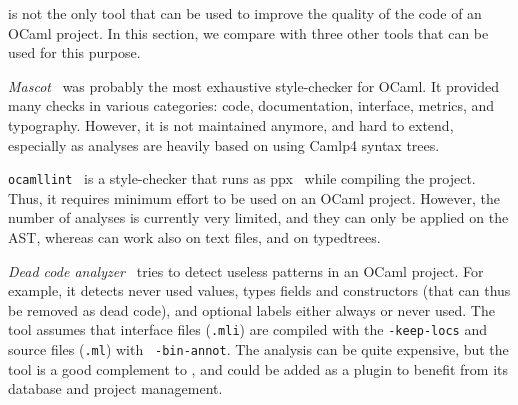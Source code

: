 \ocplint{} is not the only tool that can be used to improve the quality of
the code of an OCaml project. In this section, we compare \ocplint{} with
three other tools that can be used for this purpose.

{\em Mascot}~\cite{mascot} was probably the most exhaustive
style-checker for OCaml. It provided many checks in various
categories: code, documentation, interface, metrics, and
typography. However, it is not maintained anymore, and hard to extend,
especially as analyses are heavily based on using Camlp4 syntax trees.

{\tt ocamllint}~\cite{ocamllint} is a style-checker that runs as {\sf
ppx}~\cite{ppx-blog} while compiling the project.  Thus, it
requires minimum effort to be used on an OCaml project.  However, the
number of analyses is currently very limited, and they can only be
applied on the AST, whereas \ocplint{} can work also on text files,
and on typedtrees.

{\em Dead code analyzer}~\cite{DeadCodeAnalyzer} tries to detect
useless patterns in an OCaml project.  For example, it detects never
used values, types fields and constructors (that can thus be removed
as dead code), and optional labels either always or never used. The
tool assumes that interface files ({\tt .mli}) are compiled with the
{\tt -keep-locs} and source files ({\tt .ml}) with {\tt
-bin-annot}. The analysis can be quite expensive, but the tool is a
good complement to \ocplint{}, and could be added as a plugin to
benefit from its database and project management.
